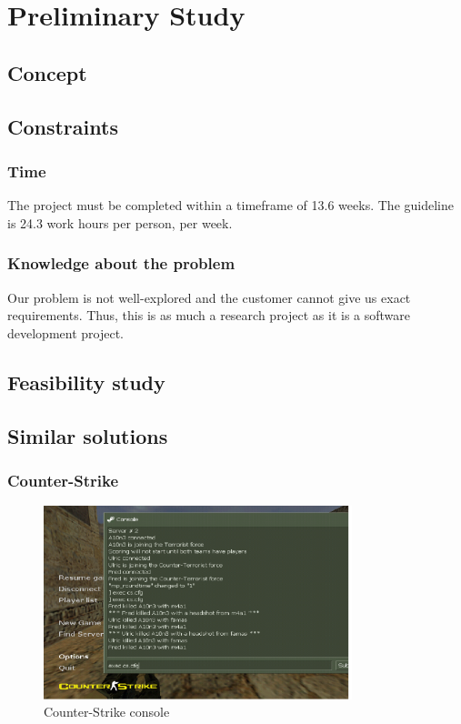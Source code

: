 \chapter{Preliminary Study}

\section{Concept}

\section{Constraints}
\subsection{Time}
The project must be completed within a timeframe of 13.6 weeks. The guideline is 24.3 work hours per person, per week. 
\subsection{Knowledge about the problem}
Our problem is not well-explored and the customer cannot give us exact requirements. Thus, this is as much a research project as it is a software development project.

\section{Feasibility study}

\section{Similar solutions}

\subsection{Counter-Strike}

\begin{figure}
\centering
\includegraphics[width = 0.8\textwidth]{image/counterstrike.png}
\caption{Counter-Strike console}
\label{image-counterstrike}
\end{figure}

